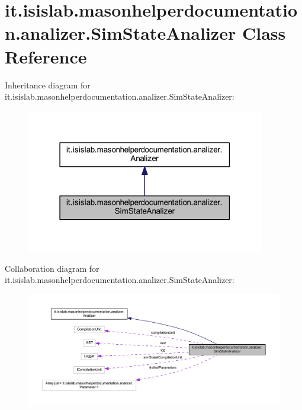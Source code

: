 \hypertarget{classit_1_1isislab_1_1masonhelperdocumentation_1_1analizer_1_1_sim_state_analizer}{\section{it.\-isislab.\-masonhelperdocumentation.\-analizer.\-Sim\-State\-Analizer Class Reference}
\label{classit_1_1isislab_1_1masonhelperdocumentation_1_1analizer_1_1_sim_state_analizer}
}


Inheritance diagram for it.\-isislab.\-masonhelperdocumentation.\-analizer.\-Sim\-State\-Analizer\-:
\nopagebreak
\begin{figure}[H]
\begin{center}
\leavevmode
\includegraphics[width=295pt]{classit_1_1isislab_1_1masonhelperdocumentation_1_1analizer_1_1_sim_state_analizer__inherit__graph}
\end{center}
\end{figure}


Collaboration diagram for it.\-isislab.\-masonhelperdocumentation.\-analizer.\-Sim\-State\-Analizer\-:
\nopagebreak
\begin{figure}[H]
\begin{center}
\leavevmode
\includegraphics[width=350pt]{classit_1_1isislab_1_1masonhelperdocumentation_1_1analizer_1_1_sim_state_analizer__coll__graph}
\end{center}
\end{figure}
